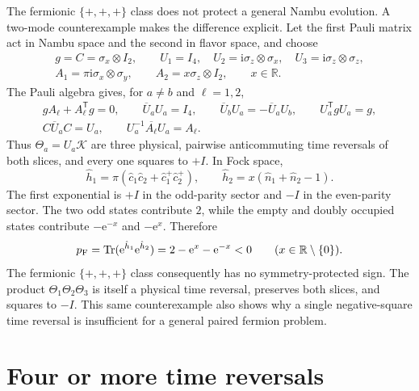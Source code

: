 \documentclass[onecolumn,aps,prb,amsmath,amssymb,superscriptaddress,longbibliography]{revtex4-2}
\newcommand{\Tr}{\operatorname{Tr}}
\newcommand{\ee}{\mathrm{e}}
\newcommand{\ii}{\mathrm{i}}
\newcommand{\trans}{\mathsf{T}}
\newcommand{\mc}[1]{\mathcal{#1}}
\begin{document}
The fermionic \(\{+,+,+\}\) class does not protect a general Nambu evolution.  A two-mode counterexample makes the difference explicit.  Let the first Pauli matrix act in Nambu space and the second in flavor space, and choose
\begin{gather}
    g=C=\sigma_x\otimes I_2,
    \qquad
    U_1=I_4,
    \quad
    U_2=\ii\sigma_z\otimes\sigma_x,
    \quad
    U_3=\ii\sigma_z\otimes\sigma_z,
    \label{eq:fermion_three_plus_U}\\
    A_1=\pi\ii\sigma_x\otimes\sigma_y,
    \qquad
    A_2=x\sigma_z\otimes I_2,
    \qquad x\in\mathbb R.
    \label{eq:fermion_three_plus_A}
\end{gather}
The Pauli algebra gives, for \(a\ne b\) and \(\ell=1,2\),
\begin{equation}
\begin{gathered}
    gA_\ell+A_\ell^\trans g=0,
    \qquad \overline U_aU_a=I_4,
    \qquad \overline U_bU_a=-\overline U_aU_b,
    \qquad U_a^\trans gU_a=g,\\
    C\overline U_aC=U_a,
    \qquad U_a^{-1}\overline{A_\ell}U_a=A_\ell.
\end{gathered}
    \label{eq:fermion_counter_checks}
\end{equation}
Thus \(\Theta_a=U_a\mc K\) are three physical, pairwise anticommuting time reversals of both slices, and every one squares to \(+I\).  In Fock space,
\begin{equation}
    \hat h_1=\pi(\hat c_1\hat c_2+\hat c_1^+\hat c_2^+),
    \qquad
    \hat h_2=x(\hat n_1+\hat n_2-1).
    \label{eq:fermion_counter_operators}
\end{equation}
The first exponential is \(+I\) in the odd-parity sector and \(-I\) in the even-parity sector.  The two odd states contribute \(2\), while the empty and doubly occupied states contribute \(-\ee^{-x}\) and \(-\ee^x\).  Therefore
\begin{equation}
    p_{\rm F}=\Tr(\ee^{\hat h_1}\ee^{\hat h_2})
    =2-\ee^x-\ee^{-x}<0
    \qquad(x\in\mathbb R\setminus\{0\}).
    \label{eq:fermion_three_plus_negative}
\end{equation}
The fermionic \(\{+,+,+\}\) class consequently has no symmetry-protected sign.  The product \(\Theta_1\Theta_2\Theta_3\) is itself a physical time reversal, preserves both slices, and squares to \(-I\).  This same counterexample also shows why a single negative-square time reversal is insufficient for a general paired fermion problem.

\section{Four or more time reversals}
\end{document}
